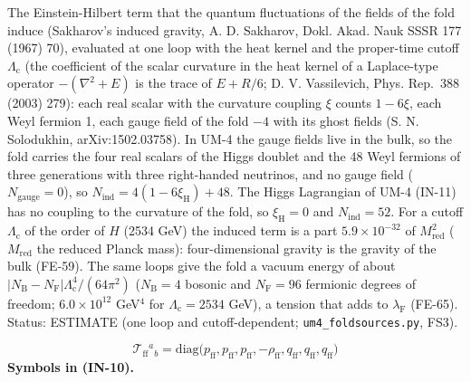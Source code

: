 \documentclass[
  10pt,
]{article}
\begin{document}
The Einstein-Hilbert term that the quantum fluctuations of the fields of
the fold induce (Sakharov's induced gravity, A. D. Sakharov, Dokl. Akad.
Nauk SSSR 177 (1967) 70), evaluated at one loop with the heat kernel and
the proper-time cutoff \(\Lambda_{\mathrm{c}}\) (the coefficient of the
scalar curvature in the heat kernel of a Laplace-type operator
\(-(\nabla^2 + E)\) is the trace of \(E + R/6\); D. V. Vassilevich,
Phys. Rep.~388 (2003) 279): each real scalar with the curvature coupling
\(\xi\) counts \(1 - 6\xi\), each Weyl fermion 1, each gauge field of
the fold \(-4\) with its ghost fields (S. N. Solodukhin,
arXiv:1502.03758). In UM-4 the gauge fields live in the bulk, so the
fold carries the four real scalars of the Higgs doublet and the 48 Weyl
fermions of three generations with three right-handed neutrinos, and no
gauge field (\(N_{\mathrm{gauge}} = 0\)), so
\(N_{\mathrm{ind}} = 4(1 - 6\xi_{\mathrm{H}}) + 48\). The Higgs
Lagrangian of UM-4 (IN-11) has no coupling to the curvature of the fold,
so \(\xi_{\mathrm{H}} = 0\) and \(N_{\mathrm{ind}} = 52\). For a cutoff
\(\Lambda_{\mathrm{c}}\) of the order of \(H\) (2534 GeV) the induced
term is a part \(5.9\times10^{-32}\) of \(M_{\mathrm{red}}^2\)
(\(M_{\mathrm{red}}\) the reduced Planck mass): four-dimensional gravity
is the gravity of the bulk (FE-59). The same loops give the fold a
vacuum energy of about
\(\lvert N_{\mathrm{B}} - N_{\mathrm{F}}\rvert\Lambda_{\mathrm{c}}^4/(64\pi^2)\)
(\(N_{\mathrm{B}} = 4\) bosonic and \(N_{\mathrm{F}} = 96\) fermionic
degrees of freedom; \(6.0\times10^{12}\) GeV\(^4\) for
\(\Lambda_{\mathrm{c}} = 2534\) GeV), a tension that adds to
\(\lambda_{\mathrm{F}}\) (FE-65). Status: ESTIMATE (one loop and
cutoff-dependent; \texttt{um4\_foldsources.py}, FS3).

\[
\mathcal{T}_{\mathrm{ff}}{}^a{}_b = \mathrm{diag}\big(p_{\mathrm{ff}}, p_{\mathrm{ff}}, p_{\mathrm{ff}}, -\rho_{\mathrm{ff}},
 q_{\mathrm{ff}}, q_{\mathrm{ff}}, q_{\mathrm{ff}}\big) \tag{IN-10}
\] \textbf{Symbols in (IN-10).}
\end{document}
